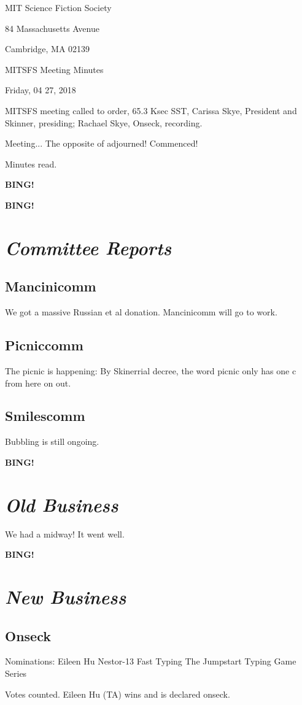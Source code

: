 \documentclass[10pt]{article}
\newcommand{\bing}{{\bf BING!} }
\newcommand{\goto}[1]{\bing \vskip 12pt \section*{{\em{#1}}}}
\newcommand{\skinner}{Carissa Skye, President and Skinner}
\newcommand{\onseck}{Rachael Skye, Onseck}
\newcommand{\meetingdate}{Friday, 04 27, 2018 }
\begin{document}
\begin{center}

MIT Science Fiction Society

84 Massachusetts Avenue

Cambridge, MA 02139

\vspace{12pt}

MITSFS Meeting Minutes

\meetingdate

\end{center}

\vspace{18pt}

\setlength{\parskip}{6pt}

\noindent
MITSFS meeting called to order, 65.3 Ksec SST,
\skinner, presiding; \onseck, recording.

Meeting... The opposite of adjourned! Commenced!

Minutes read.

\bing

\goto{Committee Reports}

\subsection*{Mancinicomm}
We got a massive Russian et al donation. Mancinicomm will go to work.

\subsection*{Picniccomm}
The picnic is happening:
By Skinerrial decree, the word picnic only has one c from here on out.

\subsection*{Smilescomm}
Bubbling is still ongoing.

\goto{Old Business}

We had a midway! It went well.

\goto{New Business}

\subsection*{Onseck}

Nominations:
Eileen Hu
Nestor-13
Fast Typing
The Jumpstart Typing Game Series

Votes counted. Eileen Hu (TA) wins and is declared onseck.
\end{document}
